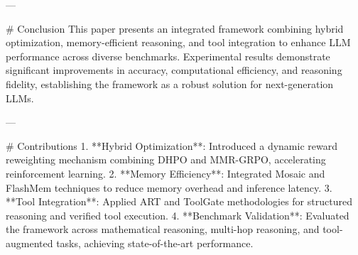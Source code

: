 ---

# Conclusion  
This paper presents an integrated framework combining hybrid optimization, memory-efficient reasoning, and tool integration to enhance LLM performance across diverse benchmarks. Experimental results demonstrate significant improvements in accuracy, computational efficiency, and reasoning fidelity, establishing the framework as a robust solution for next-generation LLMs.  

---

# Contributions  
1. **Hybrid Optimization**: Introduced a dynamic reward reweighting mechanism combining DHPO and MMR-GRPO, accelerating reinforcement learning.  
2. **Memory Efficiency**: Integrated Mosaic and FlashMem techniques to reduce memory overhead and inference latency.  
3. **Tool Integration**: Applied ART and ToolGate methodologies for structured reasoning and verified tool execution.  
4. **Benchmark Validation**: Evaluated the framework across mathematical reasoning, multi-hop reasoning, and tool-augmented tasks, achieving state-of-the-art performance.  